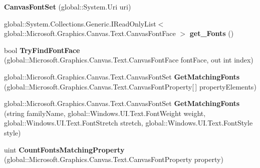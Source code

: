 \begin{DoxyCompactItemize}
{\bfseries Canvas\+Font\+Set} (global\+::\+System.\+Uri uri)
\item 
\mbox{\label{class_microsoft_1_1_graphics_1_1_canvas_1_1_text_1_1_canvas_font_set_aefa89c8fcefa001d0d56c7165ffb79ac}} 
global\+::\+System.\+Collections.\+Generic.\+I\+Read\+Only\+List$<$ global\+::\+Microsoft.\+Graphics.\+Canvas.\+Text.\+Canvas\+Font\+Face $>$ {\bfseries get\+\_\+\+Fonts} ()
\item 
\mbox{\label{class_microsoft_1_1_graphics_1_1_canvas_1_1_text_1_1_canvas_font_set_a13e365d13ed355de227da7a3145714db}} 
bool {\bfseries Try\+Find\+Font\+Face} (global\+::\+Microsoft.\+Graphics.\+Canvas.\+Text.\+Canvas\+Font\+Face font\+Face, out int index)
\item 
\mbox{\label{class_microsoft_1_1_graphics_1_1_canvas_1_1_text_1_1_canvas_font_set_a4a5e120b147d6554e916b380746b72a5}} 
global\+::\+Microsoft.\+Graphics.\+Canvas.\+Text.\+Canvas\+Font\+Set {\bfseries Get\+Matching\+Fonts} (global\+::\+Microsoft.\+Graphics.\+Canvas.\+Text.\+Canvas\+Font\+Property\mbox{[}$\,$\mbox{]} property\+Elements)
\item 
\mbox{\label{class_microsoft_1_1_graphics_1_1_canvas_1_1_text_1_1_canvas_font_set_a1e65e79bf7c6294505e0162beef419fd}} 
global\+::\+Microsoft.\+Graphics.\+Canvas.\+Text.\+Canvas\+Font\+Set {\bfseries Get\+Matching\+Fonts} (string family\+Name, global\+::\+Windows.\+U\+I.\+Text.\+Font\+Weight weight, global\+::\+Windows.\+U\+I.\+Text.\+Font\+Stretch stretch, global\+::\+Windows.\+U\+I.\+Text.\+Font\+Style style)
\item 
\mbox{\label{class_microsoft_1_1_graphics_1_1_canvas_1_1_text_1_1_canvas_font_set_a1b220e58fc624526327b3d8faccceecf}} 
uint {\bfseries Count\+Fonts\+Matching\+Property} (global\+::\+Microsoft.\+Graphics.\+Canvas.\+Text.\+Canvas\+Font\+Property property)
\item 
\mbox{\label{class_microsoft_1_1_graphics_1_1_canvas_1_1_text_1_1_canvas_font_set_a814e7ae485933c4e7fbf68602ad588b9}} 

\end{DoxyCompactItemize}
